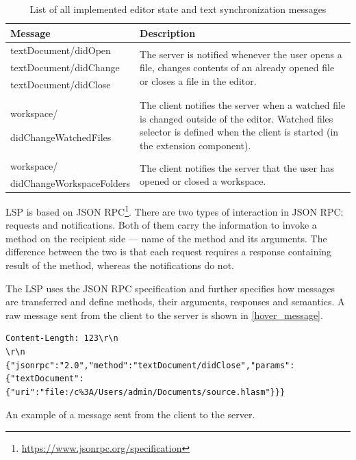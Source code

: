 \begin{table}
	\centering
	\begin{tabular}{ll}
		
		\toprule
		Message & Description \\ \midrule
		textDocument/didOpen & \multirow{3}{8.5cm}{The server is notified whenever the user opens a file, changes contents of an already opened file or closes a file in the editor.} \\
		textDocument/didChange & \\
		textDocument/didClose & \\
		& \\
		 &\multirow{4}{8.5cm}{The client notifies the server when a watched file is changed outside of the editor. Watched files selector is defined when the client is started (in the extension component).} \\
		workspace/ & \\
		didChangeWatchedFiles& \\
		& \\
		& \\
		workspace/ & \multirow{2}{8.5cm}{The client notifies the server that the user has opened or closed a workspace.} \\
		didChangeWorkspaceFolders & \\ \bottomrule
	\end{tabular}
	
	\caption{List of all implemented editor state and text synchronization messages}
	\label{lsp_text_sync_methods}
\end{table}


LSP is based on JSON RPC\footnote{\url{https://www.jsonrpc.org/specification}}. There are two types of interaction in JSON RPC: requests and notifications. Both of them carry the information to invoke a method on the recipient side ---  name of the method and its arguments. The difference between the two is that each request requires a response containing result of the method, whereas the notifications do not.

The LSP uses the JSON RPC specification and further specifies how messages are transferred and define methods, their arguments, responses and semantics. A raw message sent from the client to the server is shown in \cref{hover_message}.

\begin{listing}
	\begin{verbatim}
Content-Length: 123\r\n
\r\n
{"jsonrpc":"2.0","method":"textDocument/didClose","params":{"textDocument":
{"uri":"file:/c%3A/Users/admin/Documents/source.hlasm"}}}
	\end{verbatim}
	\caption{An example of a message sent from the client to the server.}
	\label{hover_message}
\end{listing}

